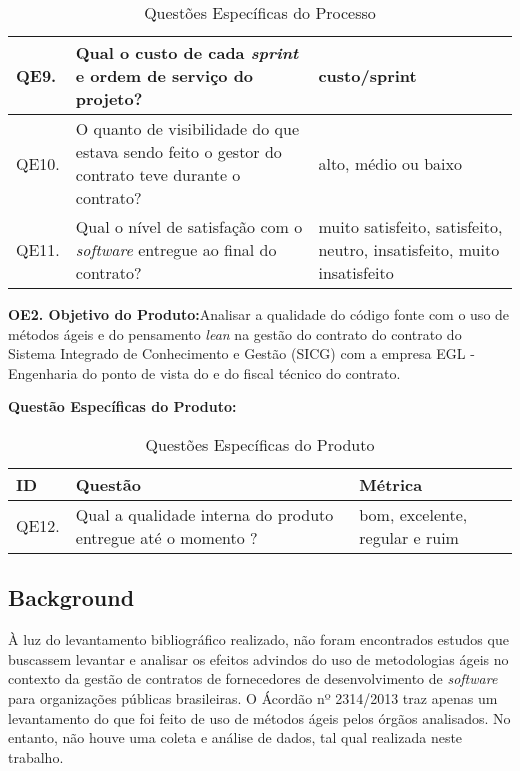 \begin{table}[H]
\begin{tabular}{|p{0.8cm}|p{8.0cm}|p{7.0cm}|}
QE9.        & Qual o custo de cada \textit{sprint} e ordem de serviço do projeto?                                                                                       &  custo/sprint               \\ \hline
QE10.        & O quanto de visibilidade do que estava sendo feito o gestor do contrato teve durante o contrato?                                      &  alto, médio ou baixo              \\ \hline
QE11.        & Qual o nível de satisfação com o \textit{software} entregue ao final do contrato?                         &   muito satisfeito, satisfeito, neutro, insatisfeito, muito insatisfeito             \\ \hline
\end{tabular}
\caption{Questões Específicas do Processo}
		\label{qespec}
\end{table}


\textbf{OE2. Objetivo do Produto:}Analisar a qualidade do código fonte com o uso de métodos ágeis e do pensamento \textit{lean} na gestão do contrato do contrato do Sistema Integrado 
de Conhecimento e Gestão (SICG) com a empresa EGL - Engenharia do ponto de vista do  e do fiscal técnico do contrato.

\textbf{Questão Específicas do Produto:}

\begin{table}[H]
\footnotesize
\center
\begin{tabular}{|p{0.8cm}|p{8.0cm}|p{7.0cm}|}
\hline
\textbf{ID} & \textbf{Questão}                                                                                                                                  & \textbf{Métrica}    \\ \hline
QE12.        &  Qual a qualidade interna do produto entregue até o momento ?                                                                            &  bom, excelente, regular e ruim       \\ \hline
\end{tabular}
\caption{Questões Específicas do Produto}
		\label{qespecprod}
\end{table}



\subsection[Background]{Background}

À luz do levantamento bibliográfico realizado, não foram encontrados estudos que buscassem levantar e analisar os efeitos advindos do uso de metodologias ágeis no contexto da gestão de contratos de fornecedores de desenvolvimento de \textit{software} para organizações públicas brasileiras. O Ácordão nº 2314/2013 traz apenas um levantamento do que foi feito de uso de métodos ágeis pelos órgãos analisados. No entanto, não houve uma coleta e análise de dados, tal qual realizada neste trabalho.

